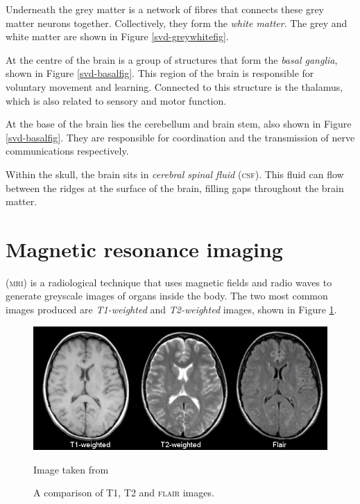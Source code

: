 Underneath the grey matter is a network of fibres that connects these grey matter neurons together. Collectively, they form the \textit{white matter}. The grey and white matter are shown in Figure \ref{svd-greywhitefig}.

At the centre of the brain is a group of structures that form the \textit{basal ganglia}, shown in Figure \ref{svd-basalfig}. This region of the brain is responsible for voluntary movement and learning. Connected to this structure is the thalamus, which is also related to sensory and motor function.

At the base of the brain lies the cerebellum and brain stem, also shown in Figure \ref{svd-basalfig}. They are responsible for coordination and the transmission of nerve communications respectively.

Within the skull, the brain sits in \textit{cerebral spinal fluid} (\textsc{csf}). This fluid can flow between the ridges  at the surface of the brain, filling gaps throughout the brain matter.


\section{Magnetic resonance imaging}\label{svd-MRI}

(\textsc{mri}) is a radiological technique that uses magnetic fields and radio waves to generate greyscale images of organs inside the body. The two most common images produced are \textit{T1-weighted} and \textit{T2-weighted} images, shown in Figure \ref{svd-t1-vs-t2}.

\begin{figure}[ht]
	\centering
	\includegraphics[width=\textwidth]{Images/2_t1_t2_flair.jpg}
	\caption{A comparison of T1, T2 and \textsc{flair} images.}
	\small Image taken from \cite{Preston2006}
	\label{svd-t1-vs-t2}
\end{figure}

